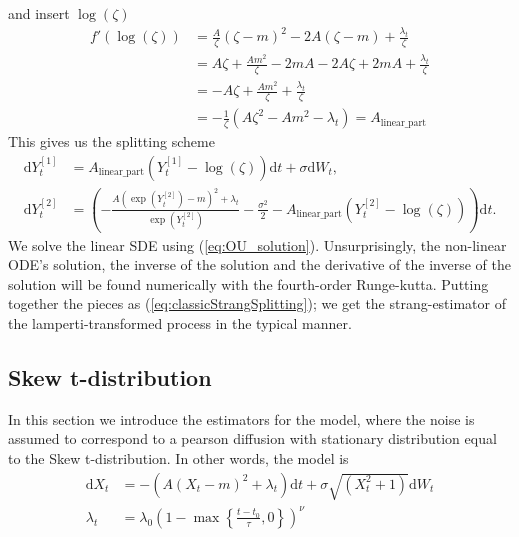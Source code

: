 and insert $\log(\zeta)$
\begin{align}
    f'(\log(\zeta)) &= \frac{A}{\zeta}\left(\zeta - m\right)^2 - 2A\left(\zeta - m\right) + \frac{\lambda_t}{\zeta}\nonumber \\
    &= A\zeta + \frac{Am^2}{\zeta} - 2mA - 2A\zeta + 2mA + \frac{\lambda_t}{\zeta}\nonumber\\
    &=-A\zeta + \frac{Am^2}{\zeta} + \frac{\lambda_t}{\zeta}\nonumber\\
    &= -\frac{1}{\zeta}\left(A\zeta^2 - Am^2 - \lambda_t\right) =  A_{\mathrm{linear\_part}}
\end{align}
This gives us the splitting scheme
\begin{align}
    \mathrm{d}Y_t^{[1]} &= A_{\mathrm{linear\_part}}\left(Y_t^{[1]} - \log\left(\zeta\right)\right)\mathrm{d}t + \sigma \mathrm{d}W_t,\\
    \mathrm{d}Y_t^{[2]} &= \left(-\frac{A\left(\exp\left(Y_t^{[2]}\right)-m\right)^2 + \lambda_t}{\exp\left(Y_t^{[2]}\right)} - \frac{\sigma^2}{2}%
    - A_{\mathrm{linear\_part}}\left(Y_t^{[2]} - \log\left(\zeta\right)\right)\right)\mathrm{d}t. \label{eq:GBMLampertiBasedStrang}
\end{align}
We solve the linear SDE using (\ref{eq:OU_solution}). Unsurprisingly, the non-linear ODE's solution, the inverse of the solution and the derivative of the inverse of the solution will be found numerically with the fourth-order Runge-kutta. Putting together the pieces as (\ref{eq:classicStrangSplitting}); we get the strang-estimator of the lamperti-transformed process in the typical manner.
\newpage
\subsection{Skew t-distribution}
In this section we introduce the estimators for the model, where the noise is assumed to correspond to a pearson diffusion with stationary distribution equal to the Skew t-distribution. In other words, the model is
\begin{align}
    \mathrm{d}X_t &= -\left(A\left(X_t - m\right)^2 + \lambda_t\right)\mathrm{d}t + \sigma \sqrt{\left(X_t^2 + 1\right)} \mathrm{d}W_t\\
    \lambda_t &= \lambda_0\left(1 - \max\left\{\frac{t - t_0}{\tau}, 0\right\}\right)^\nu
\end{align}
